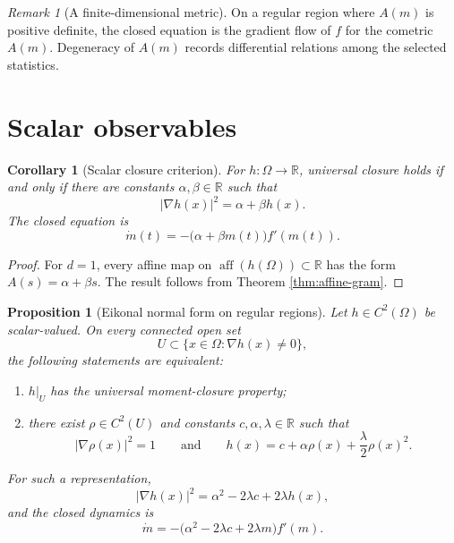 \documentclass[11pt]{article}
\newcommand{\R}{\mathbb R}
\newcommand{\aff}{\operatorname{aff}}
\newtheorem{proposition}{Proposition}
\newtheorem{corollary}{Corollary}
\theoremstyle{remark}
\newtheorem{remark}{Remark}
\begin{document}
\begin{remark}[A finite-dimensional metric]
On a regular region where \(A(m)\) is positive definite, the closed equation
is the gradient flow of \(f\) for the cometric \(A(m)\).  Degeneracy of
\(A(m)\) records differential relations among the selected statistics.
\end{remark}

\section{Scalar observables}

\begin{corollary}[Scalar closure criterion]
\label{cor:scalar}
For \(h:\Omega\to\R\), universal closure holds if and only if there are
constants \(\alpha,\beta\in\R\) such that
\[
  \boxed{
  |\nabla h(x)|^2=\alpha+\beta h(x).
  }
\]
The closed equation is
\[
  \dot m(t)
  =
  -\bigl(\alpha+\beta m(t)\bigr)f'(m(t)).
\]
\end{corollary}

\begin{proof}
For \(d=1\), every affine map on \(\aff(h(\Omega))\subset\R\) has the form
\(A(s)=\alpha+\beta s\).  The result follows from Theorem
\ref{thm:affine-gram}.
\end{proof}

\begin{proposition}[Eikonal normal form on regular regions]
\label{prop:eikonal}
Let \(h\in C^2(\Omega)\) be scalar-valued.  On every connected open set
\[
  U\subset\{x\in\Omega:\nabla h(x)\neq0\},
\]
the following statements are equivalent:
\begin{enumerate}
  \item \(h|_U\) has the universal moment-closure property;
  \item there exist \(\rho\in C^2(U)\) and constants
  \(c,\alpha,\lambda\in\R\) such that
  \[
    |\nabla\rho(x)|^2=1
    \qquad\text{and}\qquad
    h(x)
    =
    c+\alpha\rho(x)+\frac{\lambda}{2}\rho(x)^2.
  \]
\end{enumerate}
For such a representation,
\[
  |\nabla h(x)|^2
  =
  \alpha^2-2\lambda c+2\lambda h(x),
\]
and the closed dynamics is
\[
  \boxed{
  \dot m
  =
  -\bigl(\alpha^2-2\lambda c+2\lambda m\bigr)f'(m).
  }
\]
\end{proposition}
\end{document}
